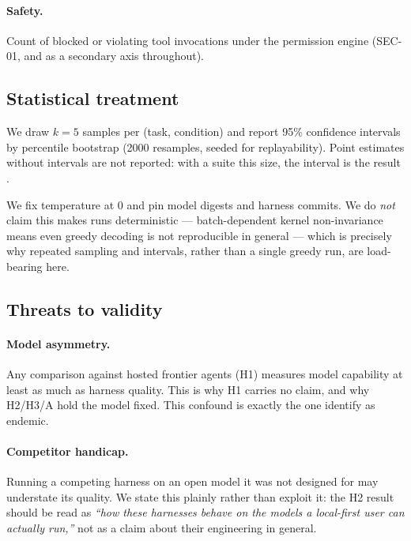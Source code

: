 \documentclass[11pt,a4paper]{article}
\begin{document}
\paragraph{Safety.} Count of blocked or violating tool invocations under the
permission engine (SEC-01, and as a secondary axis throughout).

\subsection{Statistical treatment}
\label{sec:stats}

We draw $k=5$ samples per (task, condition) and report 95\% confidence intervals
by percentile bootstrap (2000 resamples, seeded for replayability). Point
estimates without intervals are not reported: with a suite this size, the
interval is the result \citep{miller2024errorbars}.

We fix temperature at 0 and pin model digests and harness commits. We do
\emph{not} claim this makes runs deterministic --- batch-dependent kernel
non-invariance means even greedy decoding is not reproducible in general
\citep{he2025nondeterminism} --- which is precisely why repeated sampling and
intervals, rather than a single greedy run, are load-bearing here.

\subsection{Threats to validity}
\label{sec:threats}

\paragraph{Model asymmetry.} Any comparison against hosted frontier agents (H1)
measures model capability at least as much as harness quality. This is why H1
carries no claim, and why H2/H3/A hold the model fixed. This confound is exactly
the one \citet{kapoor2025aiagents} identify as endemic.

\paragraph{Competitor handicap.} Running a competing harness on an open model it
was not designed for may understate its quality. We state this plainly rather
than exploit it: the H2 result should be read as \emph{``how these harnesses
behave on the models a local-first user can actually run,''} not as a claim about
their engineering in general.
\end{document}
